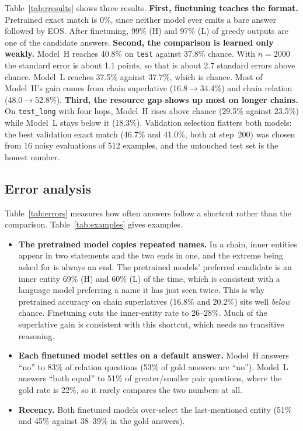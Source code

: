\documentclass[10pt,a4paper]{article}
\newcommand{\MH}{Model~H}
\newcommand{\ML}{Model~L}
\newcommand{\code}[1]{\texttt{#1}}
\begin{document}
Table~\ref{tab:rresults} shows three results.
\textbf{First, finetuning teaches the format.} Pretrained exact match is 0\%, since neither model ever emits a bare answer followed by EOS. After finetuning, 99\% (H) and 97\% (L) of greedy outputs are one of the candidate answers.
\textbf{Second, the comparison is learned only weakly.}
\MH{} reaches 40.8\% on \code{test} against 37.8\% chance. With $n=2000$ the standard error is about 1.1 points, so that is about 2.7 standard errors above chance.
\ML{} reaches 37.5\% against 37.7\%, which is chance.
Most of \MH{}'s gain comes from chain superlative (16.8$\to$34.4\%) and chain relation (48.0$\to$52.8\%).
\textbf{Third, the resource gap shows up most on longer chains.} On \code{test\_long} with four hops, \MH{} rises above chance (29.5\% against 23.5\%) while \ML{} stays below it (18.3\%).
Validation selection flatters both models: the best validation exact match (46.7\% and 41.0\%, both at step~200) was chosen from 16 noisy evaluations of 512 examples, and the untouched test set is the honest number.

\subsection{Error analysis}
Table~\ref{tab:errors} measures how often answers follow a shortcut rather than the comparison. Table~\ref{tab:examples} gives examples.
\begin{itemize}
\item \textbf{The pretrained model copies repeated names.} In a chain, inner entities appear in two statements and the two ends in one, and the extreme being asked for is always an end.
The pretrained models' preferred candidate is an inner entity 69\% (H) and 60\% (L) of the time, which is consistent with a language model preferring a name it has just seen twice.
This is why pretrained accuracy on chain superlatives (16.8\% and 20.2\%) sits well \emph{below} chance.
Finetuning cuts the inner-entity rate to 26--28\%. Much of the superlative gain is consistent with this shortcut, which needs no transitive reasoning.
\item \textbf{Each finetuned model settles on a default answer.} \MH{} answers ``no'' to 83\% of relation questions (53\% of gold answers are ``no''). \ML{} answers ``both equal'' to 51\% of greater/smaller pair questions, where the gold rate is 22\%, so it rarely compares the two numbers at all.
\item \textbf{Recency.} Both finetuned models over-select the last-mentioned entity (51\% and 45\% against 38--39\% in the gold answers).
\end{itemize}
\end{document}
